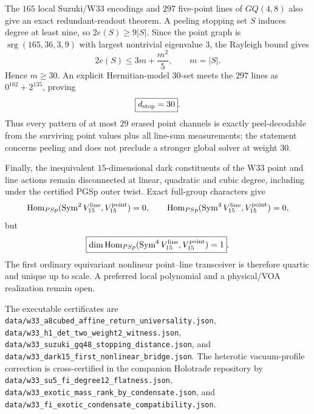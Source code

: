 The $165$ local Suzuki/W33 encodings and $297$ five-point lines of $GQ(4,8)$ also give an exact redundant-readout theorem.  A peeling stopping set $S$ induces degree at least nine, so $2e(S)\ge9|S|$.  Since the point graph is $\operatorname{srg}(165,36,3,9)$ with largest nontrivial eigenvalue $3$, the Rayleigh bound gives
\[
 2e(S)\le3m+\frac{m^2}{5},\qquad m=|S|.
\]
Hence $m\ge30$.  An explicit Hermitian-model $30$-set meets the $297$ lines as $0^{162}+2^{135}$, proving
\[
 \boxed{d_{\rm stop}=30}.
\]
Thus every pattern of at most $29$ erased point channels is exactly peel-decodable from the surviving point values plus all line-sum measurements; the statement concerns peeling and does not preclude a stronger global solver at weight $30$.

Finally, the inequivalent $15$-dimensional dark constituents of the W33 point and line actions remain disconnected at linear, quadratic and cubic degree, including under the certified PGSp outer twist.  Exact full-group characters give
\[
 \operatorname{Hom}_{PSp}(\operatorname{Sym}^2V_{15}^{\rm line},V_{15}^{\rm point})=0,
 \qquad
 \operatorname{Hom}_{PSp}(\operatorname{Sym}^3V_{15}^{\rm line},V_{15}^{\rm point})=0,
\]
but
\[
 \boxed{\dim\operatorname{Hom}_{PSp}(\operatorname{Sym}^4V_{15}^{\rm line},V_{15}^{\rm point})=1}.
\]
The first ordinary equivariant nonlinear point--line transceiver is therefore quartic and unique up to scale.  A preferred local polynomial and a physical/VOA realization remain open.

The executable certificates are
\texttt{data/w33\_a8cubed\_affine\_return\_universality.json},
\texttt{data/w33\_h1\_det\_two\_weight2\_witness.json},
\texttt{data/w33\_suzuki\_gq48\_stopping\_distance.json}, and
\texttt{data/w33\_dark15\_first\_nonlinear\_bridge.json}.  The heterotic vacuum-profile correction is cross-certified in the companion Holotrade repository by
\texttt{data/w33\_su5\_fi\_degree12\_flatness.json},
\texttt{data/w33\_exotic\_mass\_rank\_by\_condensate.json}, and
\texttt{data/w33\_fi\_exotic\_condensate\_compatibility.json}.
